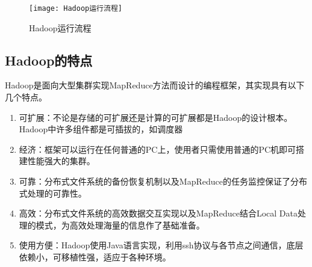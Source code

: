 \begin{figure}
 \centering
 \texttt{[image: Hadoop运行流程]}
 \caption{Hadoop运行流程}
 \label{fig:Hadoop运行流程}
\end{figure}


\subsection{Hadoop的特点}
Hadoop是面向大型集群实现MapReduce方法而设计的编程框架，其实现具有以下几个特点。

\begin{enumerate}
\item 可扩展：不论是存储的可扩展还是计算的可扩展都是Hadoop的设计根本。Hadoop中许多组件都是可插拔的，如调度器

\item 经济：框架可以运行在任何普通的PC上，使用者只需使用普通的PC机即可搭建性能强大的集群。

\item 可靠：分布式文件系统的备份恢复机制以及MapReduce的任务监控保证了分布式处理的可靠性。

\item 高效：分布式文件系统的高效数据交互实现以及MapReduce结合Local Data处理的模式，为高效处理海量的信息作了基础准备。

\item 使用方便：Hadoop使用Java语言实现，利用ssh协议与各节点之间通信，底层依赖小，可移植性强，适应于各种环境。
\end{enumerate}

